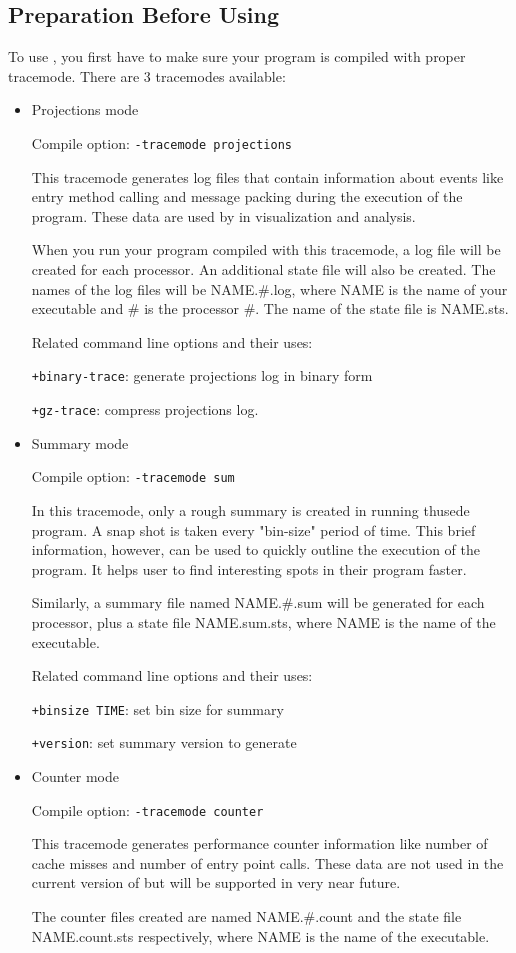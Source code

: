\subsection{Preparation Before Using \projections{}}
To use \projections{}, you first have to make sure your program is compiled with
proper \projections{} tracemode. There are 3 tracemodes available:
\begin{itemize}
\item
Projections mode

Compile option: {\tt -tracemode projections}

This tracemode generates log files that contain information about events like
entry method calling and message packing during the execution of the program.
These data are used by \projections{} in visualization and analysis.

When you run your program compiled with this tracemode, a log file will be
created for each processor.  An additional state file will also be created.  The
names of the log files will be NAME.\#.log, where NAME is the name of your
executable and \# is the processor \#.  The name of the state file is NAME.sts.

Related command line options and their uses:

{\tt +binary-trace}:  generate projections log in binary form

{\tt +gz-trace}:      compress projections log.

\item
Summary mode

Compile option: {\tt -tracemode sum}

In this tracemode, only a rough summary is created in running thusede program.
A snap shot is taken every "bin-size" period of time. This brief information,
however, can be used to quickly outline the execution of the program. It helps
user to find interesting spots in their program faster.

Similarly, a summary file named NAME.\#.sum will be generated for each processor,
plus a state file NAME.sum.sts, where NAME is the name of the executable.

Related command line options and their uses:

{\tt +binsize TIME}:   set bin size for summary

{\tt +version}:        set summary version to generate

\item
Counter mode

Compile option: {\tt -tracemode counter}

This tracemode generates performance counter information like number of cache
misses and number of entry point calls. These data are not used in the current
version of \projections{} but will be supported in very near future.

The counter files created are named NAME.\#.count and the state file NAME.count.sts
respectively, where NAME is the name of the executable.

\end{itemize}

